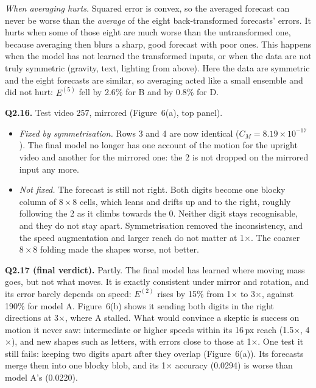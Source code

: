 \emph{When averaging hurts.} Squared error is convex, so the averaged forecast can never be worse than the
\emph{average} of the eight back-transformed forecasts' errors. It hurts when some of those eight are much worse
than the untransformed one, because averaging then blurs a sharp, good forecast with poor ones. This happens when
the model has not learned the transformed inputs, or when the data are not truly symmetric (gravity, text,
lighting from above). Here the data are symmetric and the eight forecasts are similar, so averaging acted like a
small ensemble and did not hurt: $E^{(5)}$ fell by 2.6\% for B and by 0.8\% for D.

\textbf{Q2.16.} Test video 257, mirrored (Figure~6(a), top panel).
\begin{itemize}
\item \emph{Fixed by symmetrisation.} Rows 3 and 4 are now identical ($C_M=8.19\times10^{-17}$). The final model no
longer has one account of the motion for the upright video and another for the mirrored one: the 2 is not dropped
on the mirrored input any more.
\item \emph{Not fixed.} The forecast is still not right. Both digits become one blocky column of $8\times8$ cells,
which leans and drifts up and to the right, roughly following the 2 as it climbs towards the 0. Neither digit
stays recognisable, and they do not stay apart. Symmetrisation removed the inconsistency, and the speed
augmentation and larger reach do not matter at 1$\times$. The coarser $8\times8$ folding made the shapes worse,
not better.
\end{itemize}

\textbf{Q2.17 (final verdict).} Partly. The final model has learned where moving mass goes, but not what moves. It
is exactly consistent under mirror and rotation, and its error barely depends on speed: $E^{(2)}$ rises by 15\% from
1$\times$ to 3$\times$, against 190\% for model A. Figure~6(b) shows it sending both digits in the right directions
at 3$\times$, where A stalled. What would convince a skeptic is success on motion it never saw: intermediate or
higher speeds within its 16\,px reach (1.5$\times$, 4$\times$), and new shapes such as letters, with errors close
to those at 1$\times$. One test it still fails: keeping two digits apart after they overlap (Figure~6(a)). Its
forecasts merge them into one blocky blob, and its 1$\times$ accuracy (0.0294) is worse than model A's (0.0220).
